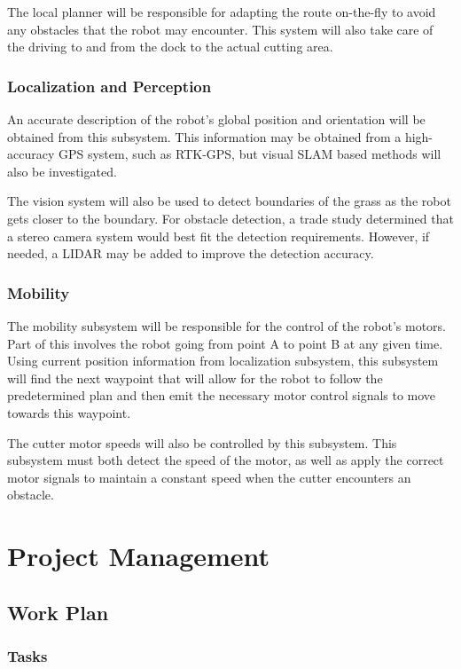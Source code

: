 \documentclass{article}
\begin{document}
			The local planner will be responsible for adapting the route on-the-fly to avoid any obstacles that the robot may encounter. This system will also take care of the driving to and from the dock to the actual cutting area. 
			
		\subsubsection{Localization and Perception}
			An accurate description of the robot's global position and orientation will be obtained from this subsystem. This information may be obtained from a high-accuracy GPS system, such as RTK-GPS, but visual SLAM based methods will also be investigated. 
			
			The vision system will also be used to detect boundaries of the grass as the robot gets closer to the boundary. For obstacle detection, a trade study determined that a stereo camera system would best fit the detection requirements. However, if needed, a LIDAR may be added to improve the detection accuracy. 
		
		\subsubsection{Mobility}
			The mobility subsystem will be responsible for the control of the robot's motors. Part of this involves the robot going from point A to point B at any given time. Using current position information from localization subsystem, this subsystem will find the next waypoint that will allow for the robot to follow the predetermined plan and then emit the necessary motor control signals to move towards this waypoint. 
			
			The cutter motor speeds will also be controlled by this subsystem. This subsystem must both detect the speed of the motor, as well as apply the correct motor signals to maintain a constant speed when the cutter encounters an obstacle. 


\section{Project Management}
\subsection{Work Plan}
\subsubsection{Tasks}
\end{document}
